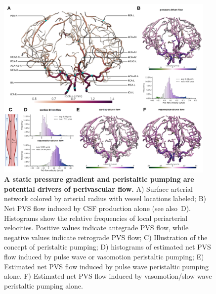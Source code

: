 \documentclass[fleqn,10pt]{wlscirep}
\begin{document}
\begin{figure}
    \centering
    \includegraphics[width=0.95\textwidth]{figures/figure3a.png}
    \caption{\textbf{A static pressure gradient and peristaltic pumping are potential drivers of perivascular flow.}
    A) Surface arterial network colored by arterial radius with vessel locations labeled;
    B) Net PVS flow induced by CSF production alone (see also~D).
    Histograms show the relative frequencies of local periarterial velocities. Positive values indicate antegrade PVS flow, while negative values indicate retrograde PVS flow;
    C) Illustration of the concept of peristaltic pumping;
    D) histograms of estimated net PVS flow induced by pulse wave or vasomotion peristaltic pumping;
    E) Estimated net PVS flow induced by pulse wave peristaltic pumping alone.
    F) Estimated net PVS flow induced by vasomotion/slow wave peristaltic pumping alone.}
    \label{fig:pvs_a}
\end{figure}
    
\end{document}

